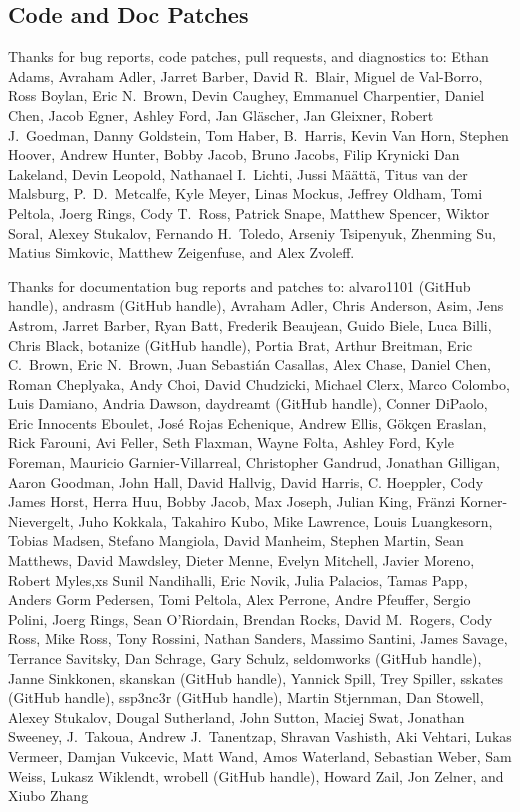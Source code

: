 \subsection*{Code  and Doc Patches}

Thanks for bug reports, code patches, pull requests, and diagnostics
to:
Ethan Adams,
Avraham Adler,
Jarret Barber,
David R.~Blair,
Miguel de Val-Borro,
Ross Boylan,
Eric N.~Brown,
Devin Caughey,
Emmanuel Charpentier,
Daniel Chen,
Jacob Egner,
Ashley Ford,
Jan Gl\"ascher,
Jan Gleixner,
Robert J.\ Goedman,
Danny Goldstein,
Tom Haber,
B.~Harris,
Kevin Van Horn,
Stephen Hoover,
Andrew Hunter,
Bobby Jacob,
Bruno Jacobs,
Filip Krynicki
Dan Lakeland,
Devin Leopold,
Nathanael I.~Lichti,
Jussi M\"a\"att\"a,
Titus van der Malsburg,
P.~D.~Metcalfe,
Kyle Meyer,
Linas Mockus,
Jeffrey Oldham,
Tomi Peltola,
Joerg Rings,
Cody T.\ Ross,
Patrick Snape,
Matthew Spencer,
Wiktor Soral,
Alexey Stukalov,
Fernando H.~Toledo,
Arseniy Tsipenyuk,
Zhenming Su,
Matius Simkovic,
Matthew Zeigenfuse,
and
Alex Zvoleff.

Thanks for documentation bug reports and patches to:
alvaro1101 (GitHub handle),
andrasm (GitHub handle),
Avraham Adler,
Chris Anderson,
Asim,
Jens Astrom,
Jarret Barber,
Ryan Batt,
Frederik Beaujean,
Guido Biele,
Luca Billi,
Chris Black,
botanize (GitHub handle),
Portia Brat,
Arthur Breitman,
Eric C.~Brown,
Eric N.~Brown,
Juan Sebasti\'an Casallas,
Alex Chase,
Daniel Chen,
Roman Cheplyaka,
Andy Choi,
David Chudzicki,
Michael Clerx,
Marco Colombo,
Luis Damiano,
Andria Dawson,
daydreamt (GitHub handle),
Conner DiPaolo,
Eric Innocents Eboulet,
Jos\'{e} Rojas Echenique,
Andrew Ellis,
G\"{o}k\c{c}en Eraslan,
Rick Farouni,
Avi Feller,
Seth Flaxman,
Wayne Folta,
Ashley Ford,
Kyle Foreman,
Mauricio Garnier-Villarreal,
Christopher Gandrud,
Jonathan Gilligan,
Aaron Goodman,
John Hall,
David Hallvig,
David Harris,
C. Hoeppler,
Cody James Horst,
Herra Huu,
Bobby Jacob,
Max Joseph,
Julian King,
Fr\"anzi Korner-Nievergelt,
Juho Kokkala,
Takahiro Kubo,
Mike Lawrence,
Louis Luangkesorn,
Tobias Madsen,
Stefano Mangiola,
David Manheim,
Stephen Martin,
Sean Matthews,
David Mawdsley,
Dieter Menne,
Evelyn Mitchell,
Javier Moreno,
Robert Myles,xs
Sunil Nandihalli,
Eric Novik,
Julia Palacios,
Tamas Papp,
Anders Gorm Pedersen,
Tomi Peltola,
Alex Perrone,
Andre Pfeuffer,
Sergio Polini,
Joerg Rings,
Sean O'Riordain,
Brendan Rocks,
David M.\ Rogers,
Cody Ross,
Mike Ross,
Tony Rossini,
Nathan Sanders,
Massimo Santini,
James Savage,
Terrance Savitsky,
Dan Schrage,
Gary Schulz,
seldomworks (GitHub handle),
Janne Sinkkonen,
skanskan (GitHub handle),
Yannick Spill,
Trey Spiller,
sskates (GitHub handle),
ssp3nc3r (GitHub handle),
Martin Stjernman,
Dan Stowell,
Alexey Stukalov,
Dougal Sutherland,
John Sutton,
Maciej Swat,
Jonathan Sweeney,
J.~Takoua,
Andrew J.~Tanentzap,
Shravan Vashisth,
Aki Vehtari,
Lukas Vermeer,
Damjan Vukcevic,
Matt Wand,
Amos Waterland,
Sebastian Weber,
Sam Weiss,
Lukasz Wiklendt,
wrobell (GitHub handle),
Howard Zail,
Jon Zelner, and
Xiubo Zhang

